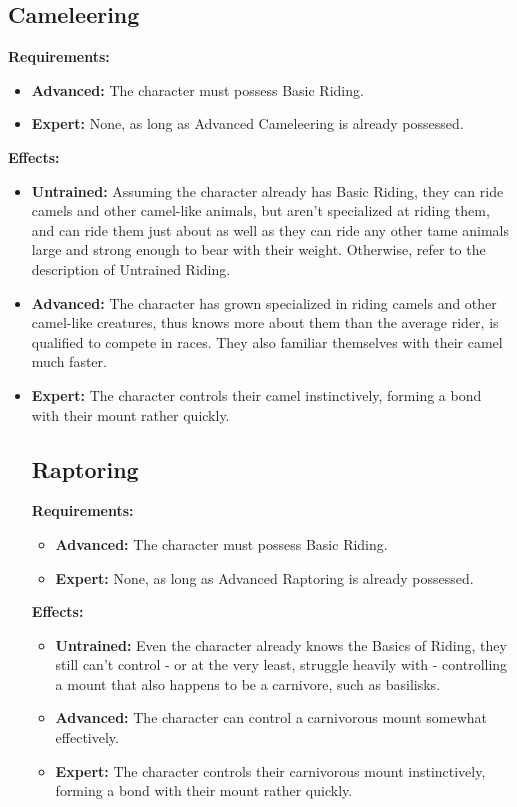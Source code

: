 \documentclass[openany,10pt,a4paper]{book}
\begin{document}
\begin{itemize}
\begin{itemize}
\subsection{Cameleering}
\textbf{Requirements:}
\begin{itemize}
	\item \textbf{Advanced:} The character must possess Basic Riding.
	\item \textbf{Expert:} None, as long as Advanced Cameleering is already possessed.
\end{itemize}
\textbf{Effects:}
\begin{itemize}
	\item \textbf{Untrained:} Assuming the character already has Basic Riding, they can ride camels and other camel-like animals, but aren't specialized at riding them, and can ride them just about as well as they can ride any other tame animals large and strong enough to bear with their weight. Otherwise, refer to the description of Untrained Riding.
	\item \textbf{Advanced:} The character has grown specialized in riding camels and other camel-like creatures, thus knows more about them than the average rider, is qualified to compete in races. They also familiar themselves with their camel much faster.
	\item \textbf{Expert:} The character controls their camel instinctively, forming a bond with their mount rather quickly.
\subsection{Raptoring}
\textbf{Requirements:}
\begin{itemize}
	\item \textbf{Advanced:} The character must possess Basic Riding.
	\item \textbf{Expert:} None, as long as Advanced Raptoring is already possessed.
\end{itemize}
\textbf{Effects:}
\begin{itemize}
	\item \textbf{Untrained:} Even the character already knows the Basics of Riding, they still can't control - or at the very least, struggle heavily with - controlling a mount that also happens to be a carnivore, such as basilisks.
	\item \textbf{Advanced:} The character can control a carnivorous mount somewhat effectively.
	\item \textbf{Expert:} The character controls their carnivorous mount instinctively, forming a bond with their mount rather quickly.

\end{itemize}
\end{itemize}
\end{itemize}
\end{itemize}
\end{document}
